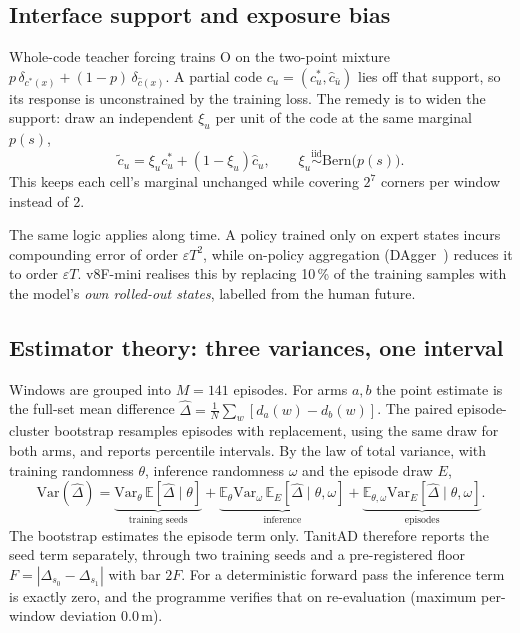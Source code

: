 \documentclass[10pt,twocolumn]{article}
\theoremstyle{remark}
\begin{document}
\subsection{Interface support and exposure bias}
Whole-code teacher forcing trains O on the two-point mixture $p\,\delta_{c^\ast(x)}+(1-p)\,\delta_{\hat c(x)}$. A partial code
$c_u=(c^\ast_u,\hat c_{\bar u})$ lies off that support, so its response is unconstrained by the training loss. The remedy is to widen
the support: draw an independent $\xi_u$ per unit of the code at the same marginal $p(s)$,
\begin{equation}
\tilde c_u=\xi_u c^\ast_u+(1-\xi_u)\hat c_u,\qquad \xi_u\stackrel{\mathrm{iid}}{\sim}\mathrm{Bern}\big(p(s)\big).
\end{equation}
This keeps each cell's marginal unchanged while covering $2^7$ corners per window instead of 2.

The same logic applies along time. A policy trained only on expert states incurs compounding error of order $\varepsilon T^2$, while
on-policy aggregation (DAgger~\cite{dagger}) reduces it to order $\varepsilon T$. v8F-mini realises this by replacing 10\,\% of the
training samples with the model's \emph{own rolled-out states}, labelled from the human future.

\subsection{Estimator theory: three variances, one interval}
Windows are grouped into $M=141$ episodes. For arms $a,b$ the point estimate is the full-set mean difference
$\hat\Delta=\frac1N\sum_w[d_a(w)-d_b(w)]$. The paired episode-cluster bootstrap resamples episodes with replacement, using the same
draw for both arms, and reports percentile intervals. By the law of total variance, with training randomness $\theta$, inference
randomness $\omega$ and the episode draw $E$,
\begin{equation}
\mathrm{Var}(\hat\Delta)=\underbrace{\mathrm{Var}_\theta\,\mathbb E[\hat\Delta\mid\theta]}_{\text{training seeds}}+\underbrace{\mathbb E_\theta\mathrm{Var}_\omega\,\mathbb E_E[\hat\Delta\mid\theta,\omega]}_{\text{inference}}+\underbrace{\mathbb E_{\theta,\omega}\mathrm{Var}_E[\hat\Delta\mid\theta,\omega]}_{\text{episodes}} .
\end{equation}
The bootstrap estimates the episode term only. TanitAD therefore reports the seed term separately, through two training seeds and a
pre-registered floor $F=|\Delta_{s_0}-\Delta_{s_1}|$ with bar $2F$. For a deterministic forward pass the inference term is exactly zero,
and the programme verifies that on re-evaluation (maximum per-window deviation 0.0\,m).
\end{document}
